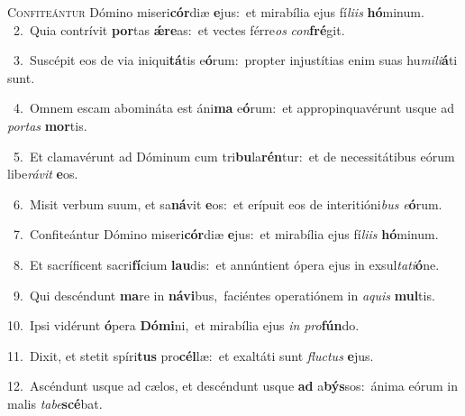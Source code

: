 \lettrine{\initial\textcolor{\initialcolor}{C}}{onfiteántur} Dómino miseri\-\textbf{cór}\-diæ \textbf{e}\-jus:~\star et mirabília ejus fí\-\textit{li}\-\textit{is} \textbf{hó}\-minum.\\
{\numbfont\textcolor{\numbcolor}{~2.}}~Quia contrívit \textbf{por}\-tas \textbf{ǽ}\-\textbf{re}as:~\star et vectes férre\textit{os} \textit{con}\-\textbf{fré}git.\par
{\numbfont\textcolor{\numbcolor}{~3.}}~Suscépit eos de via iniqui\-\textbf{tá}\-tis e\-\textbf{ó}\-rum:~\star propter injustítias enim suas hu\-\textit{mi}\-\textit{li}\textbf{á}ti sunt.\par
{\numbfont\textcolor{\numbcolor}{~4.}}~Omnem escam abomináta est áni\textbf{ma} e\-\textbf{ó}\-rum:~\star et appropinquavérunt usque ad \textit{por}\-\textit{tas} \textbf{mor}\-tis.\par
{\numbfont\textcolor{\numbcolor}{~5.}}~Et clamavérunt ad Dóminum cum tri\-\textbf{bu}\-la\-\textbf{rén}\-tur:~\star et de necessitátibus eórum libe\-\textit{rá}\-\textit{vit} \textbf{e}\-os.\par
{\numbfont\textcolor{\numbcolor}{~6.}}~Misit verbum suum, et sa\-\textbf{ná}\-vit \textbf{e}\-os:~\star et erípuit eos de interitióni\textit{bus} \textit{e}\-\textbf{ó}rum.\par
{\numbfont\textcolor{\numbcolor}{~7.}}~Confiteántur Dómino miseri\-\textbf{cór}\-diæ \textbf{e}\-jus:~\star et mirabília ejus fí\-\textit{li}\-\textit{is} \textbf{hó}\-minum.\par
{\numbfont\textcolor{\numbcolor}{~8.}}~Et sacríficent sacri\-\textbf{fí}\-cium \textbf{lau}\-dis:~\star et annúntient ópera ejus in exsul\-\textit{ta}\-\textit{ti}\textbf{ó}ne.\par
{\numbfont\textcolor{\numbcolor}{~9.}}~Qui descéndunt \textbf{ma}\-re in \textbf{ná}\-\textbf{vi}bus,~\star faciéntes operatiónem in \textit{a}\-\textit{quis} \textbf{mul}\-tis.\par
{\numbfont\textcolor{\numbcolor}{10.}}~Ipsi vidérunt \textbf{ó}\-pera \textbf{Dó}\-\textbf{mi}ni,~\star et mirabília ejus \textit{in} \textit{pro}\-\textbf{fún}do.\par
{\numbfont\textcolor{\numbcolor}{11.}}~Dixit, et stetit spíri\textbf{tus} pro\-\textbf{cél}\-læ:~\star et exaltáti sunt \textit{fluc}\-\textit{tus} \textbf{e}\-jus.\par
{\numbfont\textcolor{\numbcolor}{12.}}~Ascéndunt usque ad cælos, et descéndunt usque \textbf{ad} a\-\textbf{býs}\-sos:~\star ánima eórum in malis \textit{ta}\-\textit{be}\textbf{scé}bat.\par
